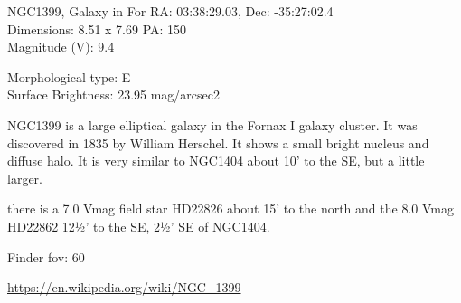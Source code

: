 \begin{block}{NGC1399, Galaxy in For}
    RA: 03:38:29.03, Dec: -35:27:02.4 \\ 
    Dimensions: 8.51 x 7.69 PA: 150 \\ 
    Magnitude (V): 9.4

    Morphological type: E \\ 
    Surface Brightness: 23.95 mag/arcsec2

    NGC1399 is a large elliptical galaxy in the Fornax I galaxy cluster. It was
    discovered in 1835 by William Herschel. It shows a small bright nucleus and
    diffuse halo. It is very similar to NGC1404 about 10' to the SE, but a
    little larger.

    there is a 7.0 Vmag field star HD22826 about 15' to the north and the 8.0
    Vmag HD22862 12½' to the SE, 2½' SE of NGC1404.


    Finder fov: 60 

    \url{https://en.wikipedia.org/wiki/NGC_1399} 
\end{block}
